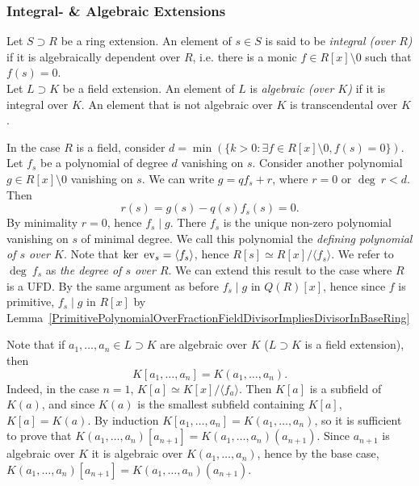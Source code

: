 \subsubsection{Integral- \& Algebraic Extensions}
\begin{definition}
    Let $S\supset R$ be a ring extension. An element of $s\in S$ is said to be \textit{integral (over $R$)} if it is algebraically dependent over $R$, i.e. there is a monic $f\in R[x]\setminus 0$ such that $f(s)=0$.\\
    Let $L\supset K$ be a field extension. An element of $L$ is \textit{algebraic (over $K$)} if it is integral over $K$. An element that is not algebraic over $K$ is transcendental over $K$. 
\end{definition}
\begin{remark}\label{MinimalPolynomialDefinitionAndTechnicalRemarks}
    In the case $R$ is a field, consider $d = \min (\{ k>0 : \exists f\in R[x]\setminus 0, f(s) =0\})$. Let $f_s$ be a polynomial of degree $d$ vanishing on $s$. Consider another polynomial $g\in R[x]\setminus 0$ vanishing on $s$. We can write $g = qf_s+r$, where $r = 0$ or $\deg \ r < d$. Then 
    $$r(s) =g(s)- q(s)f_s(s)=0.$$
    By minimality $r = 0$, hence $f_s\mid g$. There $f_s$ is the unique non-zero polynomial vanishing on $s$ of minimal degree. We call this polynomial the \textit{defining polynomial of $s$ over $K$}. Note that $\ker \ \mathrm{ev}_s = \langle f_s\rangle$, hence $R[s]\simeq R[x]/\langle f_s\rangle$. We refer to $\deg \ f_s$ as \textit{the degree of $s$ over $R$}. We can extend this result to the case where $R$ is a UFD. By the same argument as before $f_s\mid g$ in $Q(R)[x]$, hence since $f$ is primitive, $f_s\mid g$ in $R[x]$ by Lemma~\ref{PrimitivePolynomialOverFractionFieldDivisorImpliesDivisorInBaseRing} 
\end{remark}
\begin{remark}
    Note that if $a_1,\dots,a_n\in L\supset K$ are algebraic over $K$ ($L\supset K$ is a field extension), then 
    $$K[a_1,\dots,a_n] = K(a_1,\dots,a_n).$$
    Indeed, in the case $n=1$, $K[a]\simeq K[x]/\langle f_a\rangle$. Then $K[a]$ is a subfield of $K(a)$, and since $K(a)$ is the smallest subfield containing $K[a]$, $K[a]=K(a)$. By induction $K[a_1,\dots,a_n]=K(a_1,\dots,a_n)$, so it is sufficient to prove that $K(a_1,\dots,a_n)[a_{n+1}]=K(a_1,\dots,a_n)(a_{n+1})$. Since $a_{n+1}$ is algebraic over $K$ it is algebraic over $K(a_1,\dots,a_n)$, hence by the base case, $K(a_1,\dots,a_n)[a_{n+1}]=K(a_1,\dots,a_n)(a_{n+1})$.
\end{remark}

